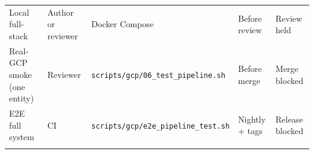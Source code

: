 \documentclass[
  11pt,
  british,
  oneside]{book}
\begin{document}
\begin{longtable}[]{@{}lllll@{}}
\begin{minipage}[t]{0.17\columnwidth}
Local full-stack\strut
\end{minipage} & \begin{minipage}[t]{0.17\columnwidth}\raggedright
Author or reviewer\strut
\end{minipage} & \begin{minipage}[t]{0.17\columnwidth}\raggedright
Docker Compose\strut
\end{minipage} & \begin{minipage}[t]{0.17\columnwidth}\raggedright
Before review\strut
\end{minipage} & \begin{minipage}[t]{0.17\columnwidth}\raggedright
Review held\strut
\end{minipage}\tabularnewline
\begin{minipage}[t]{0.17\columnwidth}\raggedright
Real-GCP smoke (one entity)\strut
\end{minipage} & \begin{minipage}[t]{0.17\columnwidth}\raggedright
Reviewer\strut
\end{minipage} & \begin{minipage}[t]{0.17\columnwidth}\raggedright
\texttt{scripts/gcp/06\_test\_pipeline.sh}\strut
\end{minipage} & \begin{minipage}[t]{0.17\columnwidth}\raggedright
Before merge\strut
\end{minipage} & \begin{minipage}[t]{0.17\columnwidth}\raggedright
Merge blocked\strut
\end{minipage}\tabularnewline
\begin{minipage}[t]{0.17\columnwidth}\raggedright
E2E full system\strut
\end{minipage} & \begin{minipage}[t]{0.17\columnwidth}\raggedright
CI\strut
\end{minipage} & \begin{minipage}[t]{0.17\columnwidth}\raggedright
\texttt{scripts/gcp/e2e\_pipeline\_test.sh}\strut
\end{minipage} & \begin{minipage}[t]{0.17\columnwidth}\raggedright
Nightly + tags\strut
\end{minipage} & \begin{minipage}[t]{0.17\columnwidth}\raggedright
Release blocked\strut
\end{minipage}\tabularnewline
\begin{minipage}[t]{0.17\columnwidth}\raggedright

\end{minipage}
\end{longtable}
\end{document}
